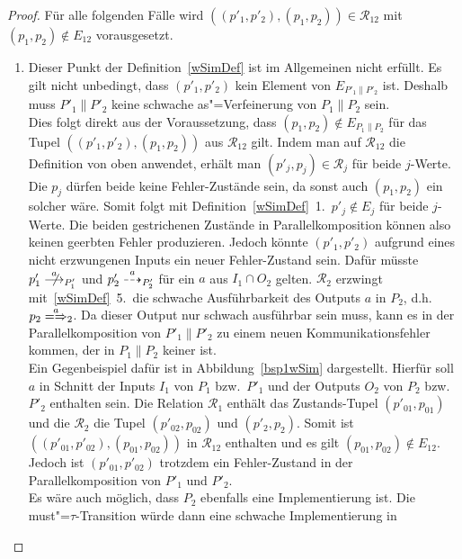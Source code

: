 \begin{proof}
  Für alle folgenden Fälle wird $((p'_1,p'_2),(p_1,p_2))\in\mathcal{R}_{12}$
  mit $(p_1,p_2)\notin E_{12}$ vorausgesetzt.
  \begin{enumerate}
    \item Dieser Punkt der Definition~\ref{wSimDef} ist im Allgemeinen nicht
      erfüllt. Es gilt nicht unbedingt, dass $(p'_1,p'_2)$ kein Element von
      $E_{P'_1\|P'_2}$ ist. Deshalb muss $P'_1\|P'_2$ keine schwache
      as"=Verfeinerung von $P_1\|P_2$ sein.\\
      Dies folgt direkt aus der Voraussetzung, dass $(p_1,p_2)\notin
      E_{P_1\|P_2}$ für das Tupel $((p'_1,p'_2),(p_1,p_2))$ aus
      $\mathcal{R}_{12}$ gilt. Indem man auf $\mathcal{R}_{12}$ die
      Definition von oben anwendet, erhält man $(p'_j,p_j)\in\mathcal{R}_j$ für
      beide $j$-Werte. Die $p_j$ dürfen beide keine Fehler-Zustände sein, da
      sonst auch $(p_1,p_2)$ ein solcher wäre. Somit folgt mit
      Definition~\ref{wSimDef}~1.\ $p'_j\notin E_j$ für beide $j$-Werte. Die
      beiden gestrichenen Zustände in Parallelkomposition können also keinen
      geerbten Fehler produzieren. Jedoch könnte $(p'_1,p'_2)$ aufgrund eines
      nicht erzwungenen Inputs ein neuer Fehler-Zustand sein. Dafür müsste
      \oBdA{} $p'_1\nmust[a]_{P'_1}$ und $p'_2\may[a]_{P'_2}$ für ein $a$ aus
      $I_1\cap O_2$ gelten. $\mathcal{R}_2$ erzwingt mit~\ref{wSimDef}~5.\ die
      schwache Ausführbarkeit des Outputs $a$ in $P_2$, d.h.\ $p_2
      \weakmay[a]_2$. Da dieser Output nur schwach ausführbar sein muss, kann
      es in der Parallelkomposition von $P'_1\|P'_2$ zu einem neuen
      Kommunikationsfehler kommen, der in $P_1\|P_2$ keiner ist.\\
      Ein Gegenbeispiel dafür ist in Abbildung~\ref{bsp1wSim} dargestellt.
      Hierfür soll $a$ in Schnitt der Inputs $I_1$ von $P_1$ bzw.\ $P'_1$ und
      der Outputs $O_2$ von $P_2$ bzw.\ $P'_2$ enthalten sein. Die Relation
      $\mathcal{R}_1$ enthält das Zustands-Tupel $(p'_{01},p_{01})$ und die
      $\mathcal{R}_2$ die Tupel $(p'_{02},p_{02})$ und $(p'_2,p_2)$. Somit ist
      $((p'_{01},p'_{02}),(p_{01},p_{02}))$ in $\mathcal{R}_{12}$ enthalten und
      es gilt $(p_{01},p_{02})\notin E_{12}$. Jedoch ist $(p'_{01},p'_{02})$
      trotzdem ein Fehler-Zustand in der Parallelkomposition von $P'_1$ und
      $P'_2$.\\
      Es wäre auch möglich, dass $P_2$ ebenfalls eine Implementierung ist. Die
      must"=$\tau$-Transition würde dann eine schwache Implementierung in

\end{enumerate}
\end{proof}
